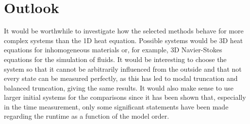 \section{Outlook}
It would be worthwhile to investigate how the selected methods behave for more complex systems than the 1D heat equation.
Possible systems would be 3D heat equations for inhomogeneous materials or, for example, 3D Navier-Stokes equations for the simulation of fluids.
It would be interesting to choose the system so that it cannot be arbitrarily influenced from the outside and that not every state can be measured perfectly, as this has led to modal truncation and balanced truncation, giving the same results.
It would also make sense to use larger initial systems for the comparisons since it has been shown that, especially in the time measurement, only some significant statements have been made regarding the runtime as a function of the model order.

